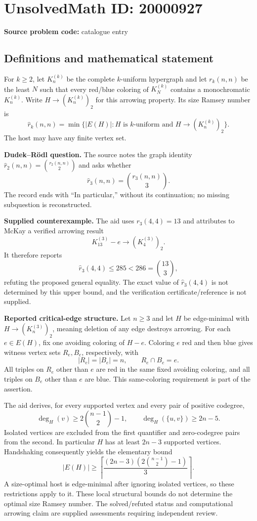 \documentclass[11pt]{article}
\begin{document}
\section*{UnsolvedMath ID: 20000927}
\textbf{Source problem code:} catalogue entry
\subsection{Definitions and mathematical statement}
For $k\geq2$, let $K_n^{(k)}$ be the complete $k$-uniform hypergraph and let $r_k(n,n)$ be the least $N$ such that every red/blue coloring of $K_N^{(k)}$ contains a monochromatic $K_n^{(k)}$. Write $H\to(K_n^{(k)})_2$ for this arrowing property. Its size Ramsey number is
\[
 \widehat r_k(n,n)=\min\{|E(H)|:H\text{ is }k\text{-uniform and }H\to(K_n^{(k)})_2\}.
\]
The host may have any finite vertex set.

\textbf{Dudek--R\"odl question.} The source notes the graph identity $\widehat r_2(n,n)=\binom{r_2(n,n)}2$ and asks whether
\[
 \widehat r_3(n,n)=\binom{r_3(n,n)}3.
\]
The record ends with ``In particular,'' without its continuation; no missing subquestion is reconstructed.

\textbf{Supplied counterexample.} The aid uses $r_3(4,4)=13$ and attributes to McKay a verified arrowing result
\[
 K_{13}^{(3)}-e\longrightarrow(K_4^{(3)})_2.
\]
It therefore reports
\[
 \widehat r_3(4,4)\leq285<286=\binom{13}3,
\]
refuting the proposed general equality. The exact value of $\widehat r_3(4,4)$ is not determined by this upper bound, and the verification certificate/reference is not supplied.

\textbf{Reported critical-edge structure.} Let $n\geq3$ and let $H$ be edge-minimal with $H\to(K_n^{(3)})_2$, meaning deletion of any edge destroys arrowing. For each $e\in E(H)$, fix one avoiding coloring of $H-e$. Coloring $e$ red and then blue gives witness vertex sets $R_e,B_e$, respectively, with
\[
 |R_e|=|B_e|=n,\qquad R_e\cap B_e=e.
\]
All triples on $R_e$ other than $e$ are red in the same fixed avoiding coloring, and all triples on $B_e$ other than $e$ are blue. This same-coloring requirement is part of the assertion.

The aid derives, for every supported vertex and every pair of positive codegree,
\[
 \deg_H(v)\geq2\binom{n-1}2-1,\qquad
 \deg_H(\{u,v\})\geq2n-5.
\]
Isolated vertices are excluded from the first quantifier and zero-codegree pairs from the second. In particular $H$ has at least $2n-3$ supported vertices. Handshaking consequently yields the elementary bound
\[
 |E(H)|\geq\left\lceil\frac{(2n-3)(2\binom{n-1}2-1)}3\right\rceil.
\]
A size-optimal host is edge-minimal after ignoring isolated vertices, so these restrictions apply to it. These local structural bounds do not determine the optimal size Ramsey number. The solved/refuted status and computational arrowing claim are supplied assessments requiring independent review.
\end{document}
